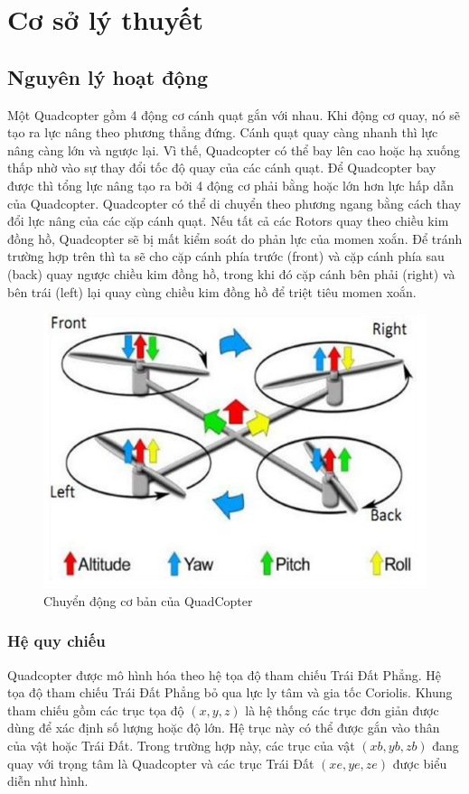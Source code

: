\chapter{Cơ sở lý thuyết} \label{chap:theory}
    \section{Nguyên lý hoạt động}
    Một Quadcopter gồm 4 động cơ cánh quạt gắn với nhau. Khi động cơ quay, nó sẽ tạo ra lực nâng theo phương thẳng đứng. Cánh quạt quay càng nhanh thì lực nâng càng lớn và ngược lại. Vì thế, Quadcopter có thể bay lên cao hoặc hạ xuống thấp nhờ vào sự thay đổi tốc độ quay của các cánh quạt. Để Quadcopter bay được thì tổng lực nâng tạo ra bởi 4 động cơ phải bằng hoặc lớn hơn lực hấp dẫn của Quadcopter.
    Quadcopter có thể di chuyển theo phương ngang bằng cách thay đổi lực nâng của các cặp cánh quạt. Nếu tất cả các Rotors quay theo chiều kim đồng hồ, Quadcopter sẽ bị mất kiểm soát do phản lực của momen xoắn. Để tránh trường hợp trên thì ta sẽ cho cặp cánh phía trước (front) và cặp cánh phía sau (back) quay ngược chiều kim đồng hồ, trong khi đó cặp cánh bên phải (right) và bên trái (left) lại quay cùng chiều kim đồng hồ để triệt tiêu momen xoắn.
    \begin{figure}[h!]
	        	\begin{center}
	        		\includegraphics[scale=0.5]{images/Cuong-MoveSim.png}
	        		\caption{Chuyển động cơ bản của QuadCopter}
	        	\end{center}
        \end{figure}
        \subsection{Hệ quy chiếu}
        Quadcopter được mô hình hóa theo hệ tọa độ tham chiếu Trái Đất Phẳng. Hệ tọa độ tham chiếu Trái Đất Phẳng bỏ qua lực ly tâm và gia tốc Coriolis.
        Khung tham chiếu gồm các trục tọa độ $(x, y, z)$ là hệ thống các trục đơn giản được dùng để xác định số lượng hoặc độ lớn. Hệ trục này có thể được gắn vào thân của vật hoặc Trái Đất. Trong trường hợp này, các trục của vật $(xb,yb,zb)$ đang quay với trọng tâm là Quadcopter và các trục Trái Đất $(xe, ye, ze)$ được biểu diễn như hình.              
